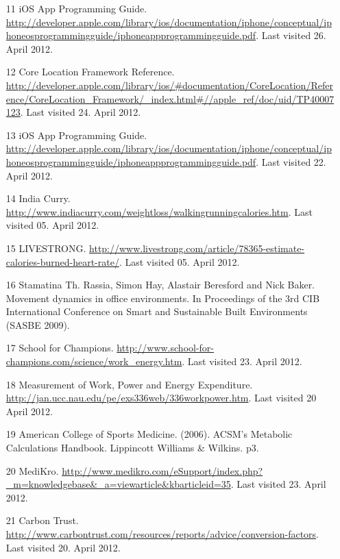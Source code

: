 \documentclass[12pt, a4paper]{report}   %
\begin{document}
\begin{enumerate}
\begin{thebibliography}{9}
\begin{itemize}
	\item [11] iOS App Programming Guide. \url{http://developer.apple.com/library/ios/documentation/iphone/conceptual/iphoneosprogrammingguide/iphoneappprogrammingguide.pdf}. Last visited 26. April 2012.\\
	\item [12] Core Location Framework Reference. \url{http://developer.apple.com/library/ios/#documentation/CoreLocation/Reference/CoreLocation_Framework/_index.html#//apple_ref/doc/uid/TP40007123}. Last visited 24. April 2012.\\
	\item [13] iOS App Programming Guide. \url{http://developer.apple.com/library/ios/documentation/iphone/conceptual/iphoneosprogrammingguide/iphoneappprogrammingguide.pdf}. Last visited 22. April 2012.\\
	\item [14] India Curry. \url{http://www.indiacurry.com/weightloss/walkingrunningcalories.htm}. Last visited 05. April 2012.\\
	\item [15] LIVESTRONG. \url{http://www.livestrong.com/article/78365-estimate-calories-burned-heart-rate/}. Last visited 05. April 2012.\\
	\item [16] Stamatina Th. Rassia, Simon Hay, Alastair Beresford and Nick Baker. Movement dynamics in office environments. In Proceedings of the 3rd CIB International Conference on Smart and Sustainable Built Environments (SASBE 2009).\\
	\item [17] School for Champions. \url{http://www.school-for-champions.com/science/work_energy.htm}. Last visited 23. April 2012.
	\item [18] Measurement of Work, Power and Energy Expenditure. \url{http://jan.ucc.nau.edu/pe/exs336web/336workpower.htm}. Last visited 20 April 2012.\\
	\item [19] American College of Sports Medicine. (2006). ACSM's Metabolic Calculations Handbook. Lippincott Williams \& Wilkins. p3.\\
	\item [20] MediKro. \url{http://www.medikro.com/eSupport/index.php?_m=knowledgebase&_a=viewarticle&kbarticleid=35}. Last visited 23. April 2012.\\
	\item [21] Carbon Trust. \url{http://www.carbontrust.com/resources/reports/advice/conversion-factors}. Last visited 20. April 2012.\\

\end{itemize}
\end{thebibliography}
\end{enumerate}
\end{document}
